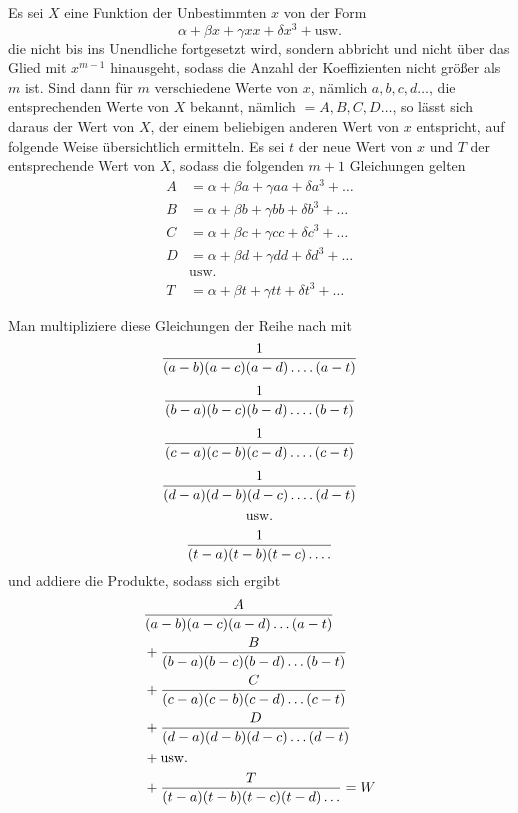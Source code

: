 \begingroup
\renewcommand{\arraystretch}{1.35}
Es sei $X$ eine Funktion der Unbestimmten $x$ von der Form
\[
\alpha+\beta x+\gamma xx+\delta x^3+\text{usw.}
\]
die nicht bis ins Unendliche fortgesetzt wird, sondern abbricht und nicht über das Glied mit $x^{m-1}$ hinausgeht, sodass die Anzahl der Koeffizienten nicht größer als $m$ ist. Sind dann für $m$ verschiedene Werte von $x$, nämlich $a,b,c,d\ldots$, die entsprechenden Werte von $X$ bekannt, nämlich $=A,B,C,D\ldots$, so lässt sich daraus der Wert von $X$, der einem beliebigen anderen Wert von $x$ entspricht, auf folgende Weise übersichtlich ermitteln. Es sei $t$ der neue Wert von $x$ und $T$ der entsprechende Wert von $X$, sodass die folgenden $m+1$ Gleichungen gelten
\[
\begin{aligned}
A&=\alpha+\beta a+\gamma aa+\delta a^3+\ldots\\
B&=\alpha+\beta b+\gamma bb+\delta b^3+\ldots\\
C&=\alpha+\beta c+\gamma cc+\delta c^3+\ldots\\
D&=\alpha+\beta d+\gamma dd+\delta d^3+\ldots\\
&\text{usw.}\\
T&=\alpha+\beta t+\gamma tt+\delta t^3+\ldots
\end{aligned}
\]
\endgroup
\par
\begingroup
\renewcommand{\arraystretch}{1.45}
Man multipliziere diese Gleichungen der Reihe nach mit
\[
\begin{gathered}
\frac{1}{(a-b)(a-c)(a-d)\mathinner{.\,.\,.\,.}(a-t)}\\[4pt]
\frac{1}{(b-a)(b-c)(b-d)\mathinner{.\,.\,.\,.}(b-t)}\\[4pt]
\frac{1}{(c-a)(c-b)(c-d)\mathinner{.\,.\,.\,.}(c-t)}\\[4pt]
\frac{1}{(d-a)(d-b)(d-c)\mathinner{.\,.\,.\,.}(d-t)}\\
\text{usw.}\\
\frac{1}{(t-a)(t-b)(t-c)\mathinner{.\,.\,.\,.}}
\end{gathered}
\]
und addiere die Produkte, sodass sich ergibt
\[
\begin{aligned}
&\frac{A}{(a-b)(a-c)(a-d)\mathinner{.\,.\,.}(a-t)}\\
&{}+\frac{B}{(b-a)(b-c)(b-d)\mathinner{.\,.\,.}(b-t)}\\
&{}+\frac{C}{(c-a)(c-b)(c-d)\mathinner{.\,.\,.}(c-t)}\\
&{}+\frac{D}{(d-a)(d-b)(d-c)\mathinner{.\,.\,.}(d-t)}\\
&{}+\text{usw.}\\
&{}+\frac{T}{(t-a)(t-b)(t-c)(t-d)\mathinner{.\,.\,.}}=W
\end{aligned}
\]
